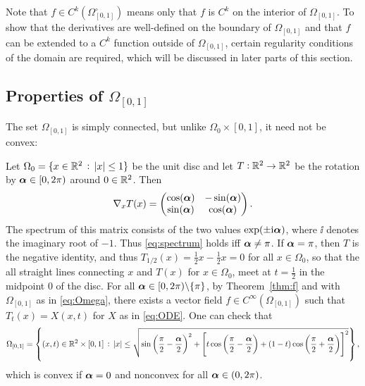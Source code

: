  
      \begin{remark}
        Note that $f\in C^k(\Omega_{[0,1]}^\circ)$ means only that $f$ is
        $C^k$ on the interior of $\Omega_{[0,1]}$. To show that the
        derivatives are well-defined on the boundary of $\Omega_{[0,1]}$ and that $f$ can be extended to a $C^k$ function outside
        of $\Omega_{[0,1]}$, certain regularity conditions of the domain are required, which will be discussed in later parts of this section.
      \end{remark}


    \subsection{Properties of $\Omega_{[0,1]}$}\label{subsection:propertiesofOmega}

   The set $\Omega_{[0,1]}$ is simply connected, but unlike
      $\Omega_0\times [0,1]$, it need not be convex:

  
\begin{example}[Rotation]
  Let $\Omega_0=\{x\in\mathbb{R}^2\, :\,|x|\le 1 \}$ be the unit disc and let
  $T:\mathbb{R}^2\to\mathbb{R}^2$ be the rotation by ${\boldsymbol \alpha}\in [0,2\pi)$ around
  $0\in\mathbb{R}^2$. Then
  \begin{equation}
    \nabla_x T(x) = \begin{pmatrix}
      \cos({\boldsymbol \alpha}) & -\sin({\boldsymbol \alpha})\\
      \sin({\boldsymbol \alpha}) & \cos({\boldsymbol \alpha})
    \end{pmatrix}.
  \end{equation}
  The spectrum of this matrix consists of the two values
  $\exp(\pm\mathrm{i}{\boldsymbol \alpha})$, where $\ii$ denotes the imaginary root of
  $-1$. Thus \eqref{eq:spectrum} holds iff ${\boldsymbol \alpha}\neq \pi$. If
  ${\boldsymbol \alpha}=\pi$, then $T$ is the negative identity, and thus
  $T_{1/2}(x)=\frac{1}{2}x - \frac{1}{2}x=0$ for all $x\in\Omega_0$,
  so that the all straight lines connecting $x$ and $T(x)$ for
  $x\in\Omega_0$, meet at $t=\frac{1}{2}$ in the midpoint $0$ of the
  disc.  For all ${\boldsymbol \alpha}\in [0,2\pi)\backslash\{\pi\}$, by
  Theorem~\ref{thm:f} and with $\Omega_{[0,1]}$ as in \eqref{eq:Omega}, there
  exists a vector field $f\in C^\infty(\Omega_{[0,1]})$ such that
  $T_t(x)=X(x,t)$ for $X$ as in \eqref{eq:ODE}. One can check that
  \begin{equation*}
    \Omega_{[0,1]} = \left\{(x,t)\in\mathbb{R}^2\times [0,1]\, :\,|x|\le
      \sqrt{\sin\left(\frac{\pi}{2}-\frac{{\boldsymbol \alpha}}{2}\right)^2+\left[t\cos\left(\frac{\pi}{2}-\frac{{\boldsymbol \alpha}}{2}\right)+(1-t)\cos\left(\frac{\pi}{2}+\frac{{\boldsymbol \alpha}}{2}\right)\right]^2}
    \right\},
  \end{equation*}
  which is convex
  if ${\boldsymbol \alpha}=0$ and nonconvex for all ${\boldsymbol \alpha}\in (0,2\pi)$.
\end{example}



